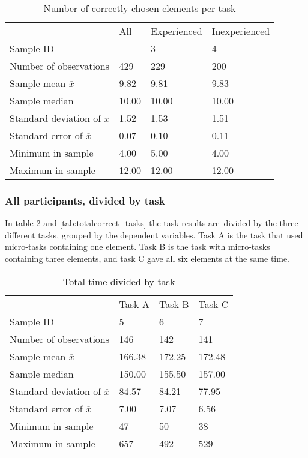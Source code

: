 \begin{table}[H]
	\centering
	\begin{tabular}{l|l|l|l}
		 & All  & Experienced & Inexperienced \\ 
		Sample ID &   & 3  & 4   \\ \hline
		Number of observations & 429    & 229  & 200   \\
		Sample mean $\overline{x}$   & 9.82 & 9.81  & 9.83  \\
		Sample median & 10.00 & 10.00 & 10.00 \\
		Standard deviation of $\overline{x}$   & 1.52  & 1.53  &  1.51 \\
		Standard error of $\overline{x}$   & 0.07  & 0.10 &  0.11 \\
		Minimum in sample & 4.00 & 5.00  &  4.00  \\
		Maximum in sample  & 12.00 & 12.00  & 12.00  \\ \hline
	\end{tabular}
	\caption[Correct elements, all participants]{Number of correctly chosen elements per task}
	\label{tab:totalcorrect_all}
\end{table}

\subsubsection{All participants, divided by task}\label{sec:taskdivided_all}

In table \ref{tab:totaltime_tasks} and \ref{tab:totalcorrect_tasks} the task results are\ divided by the three different tasks, grouped by the dependent variables. Task A is the task that used micro-tasks containing one element. Task B is the task with micro-tasks containing three elements, and task C gave all six elements at the same time. 

\begin{table}[H]
	\centering
	\begin{tabular}{l|l|l|l}
		 & Task A & Task B & Task C \\ 		
		Sample ID & 5  & 6  & 7    \\ \hline
		Number of observations & 146    & 142      & 141     \\
		Sample mean $\overline{x}$  & 166.38  &  172.25   &   172.48  \\
		Sample median & 150.00  &  155.50  & 157.00  \\
		Standard deviation of $\overline{x}$   & 84.57  & 84.21  & 77.95   \\
		Standard error of $\overline{x}$   & 7.00 & 7.07 & 6.56 \\
		Minimum in sample    & 47  & 50 &   38   \\
		Maximum in sample   & 657 & 492  & 529 \\ \hline
	\end{tabular}
	\caption[Total time, divided by task]{Total time divided by task}
	\label{tab:totaltime_tasks}
\end{table}

